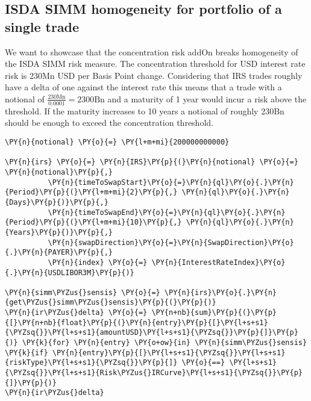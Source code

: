     

    
    \hypertarget{isda-simm-homogeneity-for-portfolio-of-a-single-trade}{%
\subsection{ISDA SIMM homogeneity for portfolio of a single
trade}\label{isda-simm-homogeneity-for-portfolio-of-a-single-trade}}

    We want to showcase that the concentration risk addOn breaks homogeneity
of the ISDA SIMM risk measure. The concentration threshold for USD
interest rate risk is 230Mn USD per Basis Point change. Considering that
IRS trades roughly have a delta of one against the interest rate this
means that a trade with a notional of
\(\frac{230\text{Mn}}{0.0001} = 2300\text{Bn}\) and a maturity of 1 year
would incur a risk above the threshold. If the maturity increases to 10
years a notional of roughly 230Bn should be enough to exceed the
concentration threshold.

    \begin{tcolorbox}[breakable, size=fbox, boxrule=1pt, pad at break*=1mm,colback=cellbackground, colframe=cellborder]
\begin{Verbatim}[commandchars=\\\{\}]
\PY{n}{notional} \PY{o}{=} \PY{l+m+mi}{200000000000}

\PY{n}{irs} \PY{o}{=} \PY{n}{IRS}\PY{p}{(}\PY{n}{notional} \PY{o}{=} \PY{n}{notional}\PY{p}{,}
          \PY{n}{timeToSwapStart}\PY{o}{=}\PY{n}{ql}\PY{o}{.}\PY{n}{Period}\PY{p}{(}\PY{l+m+mi}{2}\PY{p}{,} \PY{n}{ql}\PY{o}{.}\PY{n}{Days}\PY{p}{)}\PY{p}{,}
          \PY{n}{timeToSwapEnd}\PY{o}{=}\PY{n}{ql}\PY{o}{.}\PY{n}{Period}\PY{p}{(}\PY{l+m+mi}{10}\PY{p}{,} \PY{n}{ql}\PY{o}{.}\PY{n}{Years}\PY{p}{)}\PY{p}{,}
          \PY{n}{swapDirection}\PY{o}{=}\PY{n}{SwapDirection}\PY{o}{.}\PY{n}{PAYER}\PY{p}{,}
          \PY{n}{index} \PY{o}{=} \PY{n}{InterestRateIndex}\PY{o}{.}\PY{n}{USDLIBOR3M}\PY{p}{)}

\PY{n}{simm\PYZus{}sensis} \PY{o}{=} \PY{n}{irs}\PY{o}{.}\PY{n}{get\PYZus{}simm\PYZus{}sensis}\PY{p}{(}\PY{p}{)}
\PY{n}{ir\PYZus{}delta} \PY{o}{=} \PY{n+nb}{sum}\PY{p}{(}\PY{p}{[}\PY{n+nb}{float}\PY{p}{(}\PY{n}{entry}\PY{p}{[}\PY{l+s+s1}{\PYZsq{}}\PY{l+s+s1}{amountUSD}\PY{l+s+s1}{\PYZsq{}}\PY{p}{]}\PY{p}{)} \PY{k}{for} \PY{n}{entry} \PY{o+ow}{in} \PY{n}{simm\PYZus{}sensis} \PY{k}{if} \PY{n}{entry}\PY{p}{[}\PY{l+s+s1}{\PYZsq{}}\PY{l+s+s1}{riskType}\PY{l+s+s1}{\PYZsq{}}\PY{p}{]} \PY{o}{==} \PY{l+s+s1}{\PYZsq{}}\PY{l+s+s1}{Risk\PYZus{}IRCurve}\PY{l+s+s1}{\PYZsq{}}\PY{p}{]}\PY{p}{)}
\PY{n}{ir\PYZus{}delta}
\end{Verbatim}
\end{tcolorbox}

